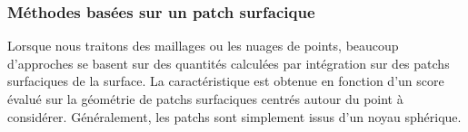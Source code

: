 %
\subsubsection{Méthodes basées sur un patch surfacique}%
\label{sec:applications:feature:patch}
%
Lorsque nous traitons des maillages ou les nuages de points, beaucoup
d'approches se basent sur des quantités calculées par intégration sur des patchs
surfaciques de la surface. La caractéristique est obtenue en fonction d'un score
évalué sur la géométrie de patchs surfaciques centrés autour du point à
considérer. Généralement, les patchs sont simplement issus d'un noyau sphérique.
%
